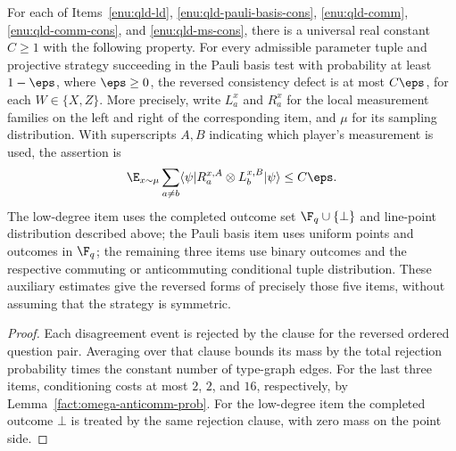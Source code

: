 \begin{lemma}
	\label{lem:qld-reversed-consistency}
	\leanok
	For each of Items~\ref{enu:qld-ld}, \ref{enu:qld-pauli-basis-cons},
	\ref{enu:qld-comm}, \ref{enu:qld-comm-cons}, and \ref{enu:qld-ms-cons},
	there is a universal real constant $C\geq1$ with the following property.
	For every admissible parameter tuple and projective strategy succeeding
	in the Pauli basis test with probability at least $1-\eps$, where
	$\eps\geq0$, the reversed consistency defect is at most $C\eps$,
	for each $W\in\{X,Z\}$.
	More precisely, write $L_a^x$ and $R_a^x$ for the local measurement
	families on the left and right of the corresponding item, and $\mu$
	for its sampling distribution. With superscripts $A,B$ indicating
	which player's measurement is used, the assertion is
	\[
	\E_{x\sim\mu}\sum_{a\ne b}
	 \langle\psi|R_a^{x,A}\otimes L_b^{x,B}|\psi\rangle
	\leq C\eps.
	\]
	The low-degree item uses the completed outcome set
	$\F_q\cup\{\bot\}$ and line-point distribution described above;
	the Pauli basis item uses uniform points and outcomes in $\F_q$;
	the remaining three items use binary outcomes and the respective
	commuting or anticommuting conditional tuple distribution.
	These auxiliary estimates give the reversed forms of precisely those
	five items, without assuming that the strategy is symmetric.
\end{lemma}
\begin{proof}
	\leanok
	Each disagreement event is rejected by the clause for the reversed
	ordered question pair. Averaging over that clause bounds its mass by
	the total rejection probability times the constant number of type-graph
	edges. For the last three items, conditioning costs at most $2$, $2$,
	and $16$, respectively, by Lemma~\ref{fact:omega-anticomm-prob}.
	For the low-degree item the completed outcome $\bot$ is treated by
	the same rejection clause, with zero mass on the point side.
\end{proof}

